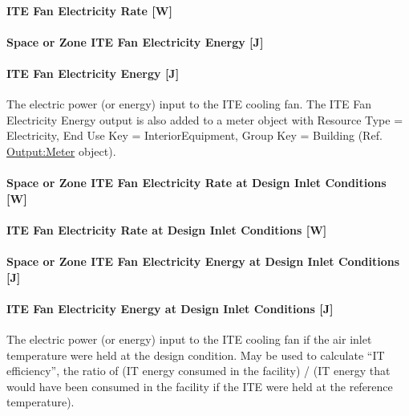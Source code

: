 \paragraph{ITE Fan Electricity Rate {[}W{]}}\label{ite-fan-electric-power-w}

\paragraph{Space or Zone ITE Fan Electricity Energy {[}J{]}}\label{zone-ite-fan-electric-energy-j}

\paragraph{ITE Fan Electricity Energy {[}J{]}}\label{ite-fan-electric-energy-j}

The electric power (or energy) input to the ITE cooling fan. The ITE Fan Electricity Energy output is also added to a meter object with Resource Type = Electricity, End Use Key = InteriorEquipment, Group Key = Building (Ref. \hyperref[outputmeter-and-outputmetermeterfileonly]{Output:Meter} object).

\paragraph{Space or Zone ITE Fan Electricity Rate at Design Inlet Conditions {[}W{]}}\label{zone-ite-fan-electric-power-at-design-inlet-conditions-w}

\paragraph{ITE Fan Electricity Rate at Design Inlet Conditions {[}W{]}}\label{ite-fan-electric-power-at-design-inlet-conditions-w}

\paragraph{Space or Zone ITE Fan Electricity Energy at Design Inlet Conditions {[}J{]}}\label{zone-ite-fan-electric-energy-at-design-inlet-conditions-j}

\paragraph{ITE Fan Electricity Energy at Design Inlet Conditions {[}J{]}}\label{ite-fan-electric-energy-at-design-inlet-conditions-j}

The electric power (or energy) input to the ITE cooling fan if the air inlet temperature were held at the design condition. May be used to calculate ``IT efficiency'', the ratio of (IT energy consumed in the facility) / (IT energy that would have been consumed in the facility if the ITE were held at the reference temperature).


